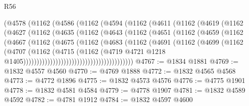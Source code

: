 \begin{lexlean}{R56}
\begin{coremodule}
                (@4578
                  (@1162
                    (@4586
                      (@1162
                        (@4594
                          (@1162
                            (@4611
                              (@1162
                                (@4619
                                  (@1162
                                    (@4627
                                      (@1162
                                        (@4635
                                          (@1162
                                            (@4643
                                              (@1162
                                                (@4651
                                                  (@1162
                                                    (@4659
                                                      (@1162
                                                        (@4667
                                                          (@1162
                                                            (@4675
                                                              (@1162
                                                                (@4683
                                                                  (@1162
                                                                    (@4691
                                                                      (@1162
                                                                        (@4699
                                                                          (@1162
                                                                            (@4707
                                                                              (@1162
                                                                                (@4715
                                                                                  (@1162
                                                                                    (@4719
                                                                                      @4721
                                                                                      @1218
                                                                                      @1405)))))))))))))))))))))))))))))))))))))))))
@4767 := @1834 @1881
@4769 := @1832 @4557 @4560
@4770 := @4769 @1888
@4772 := @1832 @4565 @4568
@4773 := @4772 @1896
@4775 := @1832 @4573 @4576
@4776 := @4775 @1901
@4778 := @1832 @4581 @4584
@4779 := @4778 @1907
@4781 := @1832 @4589 @4592
@4782 := @4781 @1912
@4784 := @1832 @4597 @4600

\end{coremodule}
\end{lexlean}
